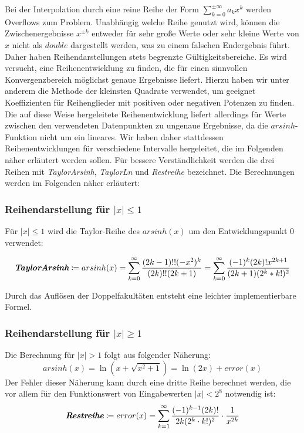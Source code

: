 \documentclass[course=erap] {aspdoc}
\begin{document}
    Bei der Interpolation durch eine reine Reihe der Form $\sum_{k=0}^{\pm\infty} a_k x^k$ werden Overflows zum Problem.
    Unabhängig welche Reihe genutzt wird, können die Zwischenergebnisse $x^{\pm k}$ entweder für sehr große Werte oder sehr kleine Werte von $x$ nicht als $double$ dargestellt werden, was zu einem falschen Endergebnis führt.
    Daher haben Reihendarstellungen stets begrenzte Gültigkeitsbereiche.
    Es wird versucht, eine Reihenentwicklung zu finden, die für einen sinnvollen Konvergenzbereich möglichst genaue Ergebnisse liefert.
    Hierzu haben wir unter anderem die Methode der kleinsten Quadrate verwendet, um geeignet Koeffizienten für Reihenglieder mit positiven oder negativen Potenzen zu finden.
    Die auf diese Weise hergeleitete Reihenentwicklung liefert allerdings für Werte zwischen den verwendeten Datenpunkten zu ungenaue Ergebnisse, da die $arsinh$-Funktion nicht um ein lineares.
    Wir haben daher stattdessen Reihenentwicklungen für verschiedene Intervalle hergeleitet, die im Folgenden näher erläutert werden sollen.
    Für bessere Verständlichkeit werden die drei Reihen mit \textit{TaylorArsinh}, \textit{TaylorLn} und \textit{Restreihe} bezeichnet.
    Die Berechnungen werden im Folgenden näher erläutert:

    \subsubsection{Reihendarstellung für $|x|\leq 1$}
    Für $|x| \leq 1$ wird die Taylor-Reihe des $arsinh(x)$ um den Entwicklungspunkt 0 verwendet:

    \[
        \textit{\textbf{TaylorArsinh}}\coloneqq arsinh(x) = \sum_{k = 0}^{\infty} \frac{(2k-1)!!(-x^2)^k}{(2k)!!(2k + 1)}
        = \sum_{k = 0}^{\infty} \frac{(-1)^k(2k)!x^{2k + 1}}{(2k + 1)(2^k*k!)^2}
    \]

    Durch das Auflösen der Doppelfakultäten entsteht eine leichter implementierbare Formel.

    \subsubsection{Reihendarstellung für $|x|\geq 1$}
    Die Berechnung für $|x| > 1$ folgt aus folgender Näherung:
    \[
        arsinh(x) = \ln(x + \sqrt{x^2 + 1}) = \ln(2x) + error(x)
    \]
    Der Fehler dieser Näherung kann durch eine dritte Reihe berechnet werden, die vor allem für den Funktionswert von Eingabewerten $|x| < 2^{8}$ notwendig ist:
    \[
        \textit{\textbf{Restreihe}}\coloneqq error(x) =  \sum_{k = 1}^{\infty} \frac{(-1)^{k - 1}(2k)!}{2k(2^k\cdot k!)^2} \cdot \frac{1}{x^{2k}}
    \]
\end{document}
